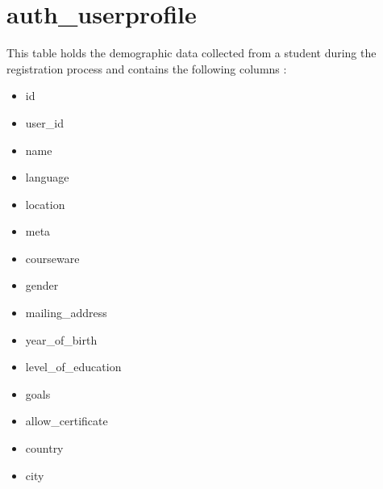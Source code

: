 \documentclass[a4paper,12pt,oneside]{sphinxmanual}
\begin{document}
\section{auth\_userprofile}
\label{document:auth-userprofile}
This table holds the demographic data collected from a student during the registration process and contains the following columns :
\begin{itemize}
\item {} 
id

\item {} 
user\_id

\item {} 
name

\item {} 
language

\item {} 
location

\item {} 
meta

\item {} 
courseware

\item {} 
gender

\item {} 
mailing\_address

\item {} 
year\_of\_birth

\item {} 
level\_of\_education

\item {} 
goals

\item {} 
allow\_certificate

\item {} 
country

\item {} 
city

\end{itemize}
\end{document}
